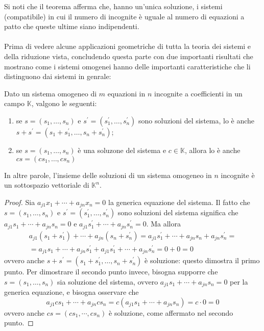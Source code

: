 \begin{oss}
  \label{oss:guess-jorda2}
  Si noti che il teorema afferma che, hanno un'unica soluzione, i sistemi
  (compatibile) in cui il numero di incognite è uguale al numero di
  equazioni a patto che queste ultime siano indipendenti.\\\\
  Prima di vedere alcune applicazioni geometriche di tutta la teoria
  dei sistemi e della riduzione vista, concludendo questa parte con due
  importanti risultati che mostrano come i sistemi omogenei hanno delle
  importanti caratteristiche che li distinguono dai sistemi in genrale:
\end{oss}
\begin{prop}
  \label{prop:gauss-jorda3}
  Dato un sistema omogeneo di $m$ equazioni in $n$ incognite a
  coefficienti in un campo $\mathds{K}$, valgono le seguenti:
  \begin{enumerate}
  \item se $s=(s_1,\dots,s_n)$ e $s^\prime=(s_1^\prime,\dots,s_n^\prime)$
    sono soluzioni del sistema, lo è anche $s+s^\prime=(s_1+s_1^\prime,
    \dots,s_n+s_n^\prime)$;
  \item se $s=(s_1,\dots,s_n)$ è una soluzone del sistema e $c\in
    \mathds{K}$, allora lo è anche $cs=(cs_1,\dots,cs_n)$
  \end{enumerate}
  In altre parole, l'insieme delle soluzioni di un sistema omogeneo in
  $n$ incognite è un sottospazio vettoriale di $\mathds{K}^n$.
\end{prop}
\begin{proof}
  Sia $a_{j1}x_1+\cdots+a_{jn}x_n=0$ la generica equazione del sistema. Il
  fatto che $s=(s_1,\dots,s_n)$ e $s^\prime=(s_1^\prime,\dots,s_n^\prime)$
  sono soluzioni del sistema significa che $a_{j1}s_1+\cdots+a_{jn}s_n=0$
  e $a_{j1}s_{1}^\prime+\cdots+a_{jn}s_n^\prime=0$. Ma allora
  \begin{equation}
    \label{eq:gauss-jorda3-1}
    \begin{matrix}
      a_{j1} (s_1+s^\prime_1) +\cdots+a_{jn}(s_n+s_n^\prime)=a_{j1}s_1^\prime+
      \cdots+a_{jn} s_n+a_{jn}s_n^\prime=\\
      =a_{j1}s_1+\cdots+a_{jn}s_1^\prime+a_{j1}s_1^\prime+\cdots+a_{jn}s_n^\prime=0+0=0
    \end{matrix}
  \end{equation}
  ovvero anche $s+s^\prime=(s_1+s_1^\prime,\dots,s_n+s_n^\prime)$ è
  soluzione: questo dimostra il primo punto.
  Per dimostrare il secondo punto invece, bisogna supporre che
  $s=(s_1,\dots,s_n)$ sia soluzione del sistema, ovvero
  $a_{j1}s_1+\cdots+a_{jn}s_n=0$ per la generica equazione, e bisogna
  osservare che
  \begin{equation}
    \label{eq:gauss-jorda3-2}
    a_{j1}cs_1+\cdots+a_{jn}cs_n=c(a_{j1}s_1+\cdots+a_{jn}s_n)=c\cdot0=0
  \end{equation}
  ovvero anche $cs=(cs_1,\cdots,cs_n)$ è soluzione, come affermato
  nel secondo punto.
\end{proof}
